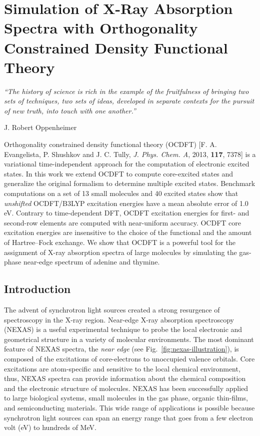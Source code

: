 \documentclass{article}
\begin{document}
\chapter{Simulation of X-Ray Absorption Spectra with Orthogonality Constrained Density Functional Theory}
\epigraph{\textit{``The history of science is rich in the example of the fruitfulness of bringing two sets of techniques, two sets of ideas, developed in separate contexts for the pursuit of new truth, into touch with one another.''}}{J. Robert Oppenheimer}
\begin{chapabstract}
Orthogonality constrained density functional theory (OCDFT) [F. A. Evangelista, P. Shushkov and J. C. Tully, \textit{J. Phys. Chem. A}, 2013, {\bf{117}}, 7378] is a variational time-independent approach for the computation of electronic excited states.
In this work we extend OCDFT  to compute core-excited states and generalize the original formalism to determine multiple excited states.
Benchmark computations on a set of 13 small molecules and 40 excited states show that \textit{unshifted} OCDFT/B3LYP excitation energies have a mean absolute error of 1.0 eV.
Contrary to time-dependent DFT, OCDFT excitation energies for first- and second-row elements are computed with near-uniform accuracy.
OCDFT core excitation energies are insensitive to the choice of the functional and the amount of Hartree--Fock exchange.
We show that OCDFT is a powerful tool for the assignment of X-ray absorption spectra of large molecules by simulating the gas-phase near-edge spectrum of adenine and thymine.
\end{chapabstract}

\section{Introduction}
The advent of synchrotron light sources created a strong resurgence of spectroscopy in the X-ray region. \cite{mcmillan_synchrotronproposed_1945} Near-edge X-ray absorption spectroscopy (NEXAS) is a useful experimental technique to probe the local electronic and geometrical structure in a variety of molecular environments.
The most dominant feature of NEXAS spectra, the \textit{near edge}  (see Fig.~\ref{fig:nexas-illustration}), is composed of the excitations of core-electrons to unoccupied valence orbitals.
Core excitations are atom-specific and sensitive to the local chemical environment, thus, NEXAS spectra can provide information about the chemical composition and the electronic structure of molecules.
NEXAS has been successfully applied to large biological systems, \cite{hua_refinement_2010} small molecules in the gas phase,\cite{contini_gas-phase_2001} organic thin-films,\cite{hahner_near_2006} and semiconducting materials.\cite{guo_electronic_2011} This wide range of applications is possible because synchrotron light sources can span an energy range that goes from a few electron volt (eV) \cite{feneberg_synchrotron-based_2011} to hundreds of MeV.\cite{nakazato_observation_1989}
\end{document}
